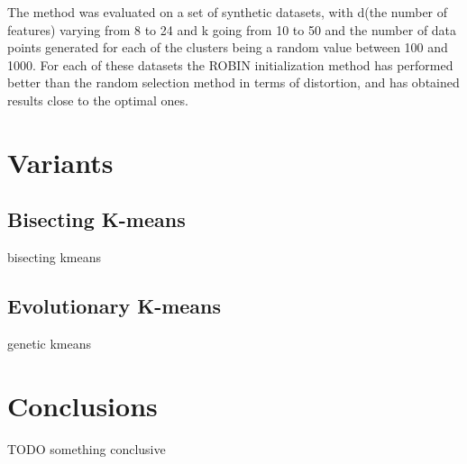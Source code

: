 \documentclass[12pt]{article}
\begin{document}
	The method was evaluated on a set of synthetic datasets, with d(the number of features) varying from 8 to 24 and k going from 10 to 50 and the number of data points generated for each of the clusters being a random value between 100 and 1000. For each of these datasets the ROBIN initialization method has performed better than the random selection method in terms of distortion, and has obtained results close to the optimal ones.
	
	\section{Variants}
	\subsection{Bisecting K-means} 
	bisecting kmeans
	
	\subsection{Evolutionary K-means }
	genetic kmeans
	
	
	\section{Conclusions}
	TODO something conclusive
	
	\newpage
	
	
\end{document}
